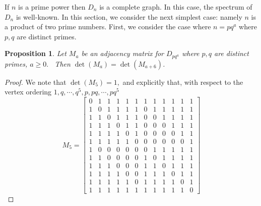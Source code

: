 \documentclass[11pt,a4paper]{amsart}
\newtheorem{prop}[thm]{Proposition}
\theoremstyle{definition}
\numberwithin{equation}{section}
\begin{document}
If $n$ is a prime power then $D_n$ is a complete graph. In this case, the spectrum of $D_n$ is well-known. In this section, we consider the next simplest case: namely $n$ is a product of two prime numbers. First, we consider the case where $n=pq^a$ where $p,q$ are distinct primes. 
\begin{prop} 
Let $M_{a}$ be an adjacency matrix for $D_{pq^{a}}$ where $p,q$ are distinct
primes, $a\geq 0.$   \ Then $\det (M_{a})=\det (M_{a+6})$.
\end{prop}

\begin{proof}
We note that $\det (M_{5})=1,$ and explicitly that, with respect to the
vertex ordering  $1,q,\cdots ,q^{5},p,pq,\cdots ,pq^{5}$ 
\[
M_{5}=\left[ 
\begin{array}{cccccccccccc}
0 & 1 & 1 & 1 & 1 & 1 & 1 & 1 & 1 & 1 & 1 & 1 \\ 
1 & 0 & 1 & 1 & 1 & 1 & 0 & 1 & 1 & 1 & 1 & 1 \\ 
1 & 1 & 0 & 1 & 1 & 1 & 0 & 0 & 1 & 1 & 1 & 1 \\ 
1 & 1 & 1 & 0 & 1 & 1 & 0 & 0 & 0 & 1 & 1 & 1 \\ 
1 & 1 & 1 & 1 & 0 & 1 & 0 & 0 & 0 & 0 & 1 & 1 \\ 
1 & 1 & 1 & 1 & 1 & 0 & 0 & 0 & 0 & 0 & 0 & 1 \\ 
1 & 0 & 0 & 0 & 0 & 0 & 0 & 1 & 1 & 1 & 1 & 1 \\ 
1 & 1 & 0 & 0 & 0 & 0 & 1 & 0 & 1 & 1 & 1 & 1 \\ 
1 & 1 & 1 & 0 & 0 & 0 & 1 & 1 & 0 & 1 & 1 & 1 \\ 
1 & 1 & 1 & 1 & 0 & 0 & 1 & 1 & 1 & 0 & 1 & 1 \\ 
1 & 1 & 1 & 1 & 1 & 0 & 1 & 1 & 1 & 1 & 0 & 1 \\ 
1 & 1 & 1 & 1 & 1 & 1 & 1 & 1 & 1 & 1 & 1 & 0%
\end{array}%
\right] 
\]


\end{proof}
\end{document}
